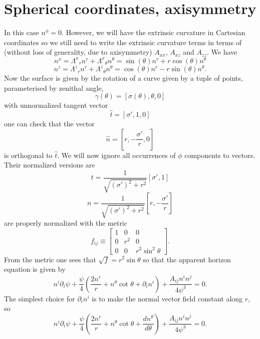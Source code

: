 \documentclass[a4paper,10pt]{article}
\begin{document}
\section{Spherical coordinates, axisymmetry}
In this case $n^\phi = 0$. However, we will have the extrinsic curvature in Cartesian coordinates so we still need to write the extrinsic curvature terms in terms of (without loss of generality, due to axisymmetry) $A_{xx}$, $A_{xz}$ and $A_{zz}$. We have
\begin{equation}
 n^x = \Lambda^x{}_r n^r + \Lambda^x{}_\theta n^\theta = \sin{(\theta)}n^r + r\cos{(\theta)}n^\theta
\end{equation}
\begin{equation}
 n^z = \Lambda^z{}_r n^r + \Lambda^z{}_\theta n^\theta = \cos{(\theta)}n^r - r\sin{(\theta)}n^\theta.
\end{equation}
Now the surface is given by the rotation of a curve given by a tuple of points, parameterised by zenithal angle,
\begin{equation}
 \gamma(\theta) = \left[\sigma(\theta), \theta, 0\right]
\end{equation}
with unnormalized tangent vector
\begin{equation}
 \hat{t} = \left[\sigma', 1, 0\right]
\end{equation}
one can check that the vector
\begin{equation}
 \hat{n} = \left[r, -\frac{\sigma'}{r}, 0\right]
\end{equation}
is orthogonal to $\hat{t}$. We will now ignore all occurrences of $\phi$ components to vectors. Their normalized versions are
\begin{equation}
 t = \frac{1}{\sqrt{\left(\sigma'\right)^2 + r^2}}\left[\sigma', 1\right]
\end{equation}
\begin{equation}
 n = \frac{1}{\sqrt{\left(\sigma'\right)^2 + r^2}}\left[r, -\frac{\sigma'}{r}\right]
\end{equation}
are properly normalized with the metric
\begin{equation}
 \displaystyle{
  f_{ij} \equiv \left[
  \begin{array}{ccc}
   1 & 0 & 0\\
   0 & r^2 & 0\\
   0 & 0 & r^2\sin^2\theta
  \end{array} \right].
 }
\end{equation}
From the metric one sees that $\sqrt{f} = r^2\sin\theta$ so that the apparent horizon equation is given by
\begin{equation}
 n^i\partial_i\psi + \frac{\psi}{4}\left( \frac{2n^r}{r} + n^\theta\cot\theta + \partial_in^i\right) + \frac{A_{ij}n^in^j}{4\psi^3} = 0.
\end{equation}
The simplest choice for $\partial_in^i$ is to make the normal vector field constant along $r$, so
\begin{equation}
 n^i\partial_i\psi + \frac{\psi}{4}\left( \frac{2n^r}{r} + n^\theta\cot\theta + \frac{dn^\theta}{d\theta}\right) + \frac{A_{ij}n^in^j}{4\psi^3} = 0.
\end{equation}
\end{document}
